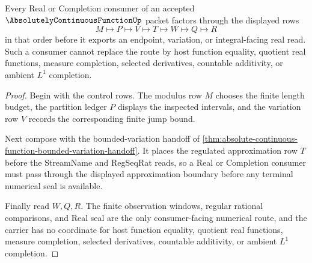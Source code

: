 \begin{theorem}
\label{thm:absolute-continuous-function-real-completion-consumer-boundary}
Every Real or Completion consumer of an accepted $\AbsolutelyContinuousFunctionUp$ packet factors through the displayed rows
$$
M \longmapsto P \longmapsto V \longmapsto T \longmapsto W \longmapsto Q \longmapsto R
$$
in that order before it exports an endpoint, variation, or integral-facing real read. Such a consumer cannot replace the route by host function equality, quotient real functions, measure completion, selected derivatives, countable additivity, or ambient $L^1$ completion.
\end{theorem}
\begin{proof}
Begin with the control rows. The modulus row $M$ chooses the finite length budget, the partition ledger $P$ displays the inspected intervals, and the variation row $V$ records the corresponding finite jump bound.

Next compose with the bounded-variation handoff of \autoref{thm:absolute-continuous-function-bounded-variation-handoff}. It places the regulated approximation row $T$ before the StreamName and RegSeqRat reads, so a Real or Completion consumer must pass through the displayed approximation boundary before any terminal numerical seal is available.

Finally read $W,Q,R$. The finite observation windows, regular rational comparisons, and Real seal are the only consumer-facing numerical route, and the carrier has no coordinate for host function equality, quotient real functions, measure completion, selected derivatives, countable additivity, or ambient $L^1$ completion.
\end{proof}


